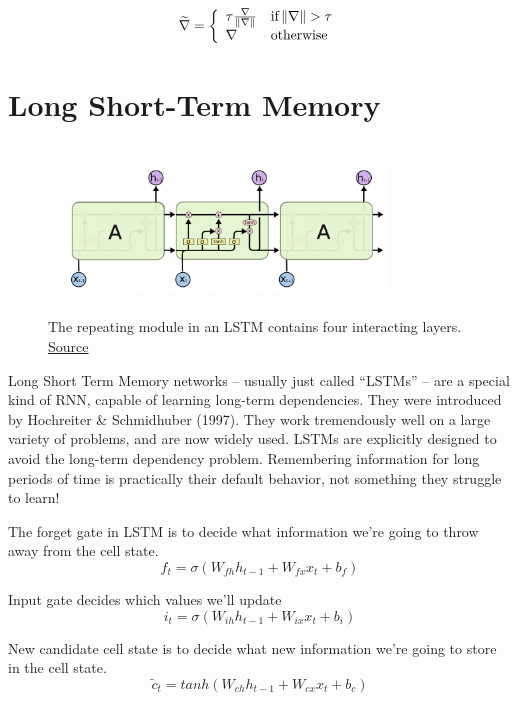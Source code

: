 \[
\widetilde{\nabla}=\left\{
            \begin{array}{ll}
              \tau\frac{\nabla}{\norm{\nabla}} & \text{if}  \norm{\nabla}>\tau\\
              \nabla & \text{otherwise}
            \end{array}
          \right.
\]

\section{Long Short-Term Memory}

\begin{figure}[h]
  \centering
      \includegraphics[width=0.8\textwidth,height=4.5cm]{lectures/06-b-rnn/image/lstm.png}
          \caption{
            The repeating module in an LSTM contains four interacting layers.
            \href{http://colah.github.io/posts/2015-08-Understanding-LSTMs/}{Source}
          }
          \label{fig:lstm}
\end{figure}

Long Short Term Memory networks – usually just called “LSTMs” – are a special kind of RNN, capable of learning long-term dependencies. 
They were introduced by Hochreiter \& Schmidhuber (1997). They work tremendously well on a large variety of problems, and are now widely used.
LSTMs are explicitly designed to avoid the long-term dependency problem. 
Remembering information for long periods of time is practically their default behavior, not something they struggle to learn!

The forget gate in LSTM is to decide what information we’re going to throw away from the cell state.
\[f_t = \sigma(W_{fh}h_{t-1}+W_{fx}x_t + b_f) \]

Input gate decides which values we’ll update
\[i_t = \sigma(W_{ih}h_{t-1} + W_{ix}x_t + b_i)\]

New candidate cell state is to decide what new information we’re going to store in the cell state.
\[\widetilde{c}_t = tanh(W_{ch}h_{t-1} + W_{cx}x_t + b_c)\]

